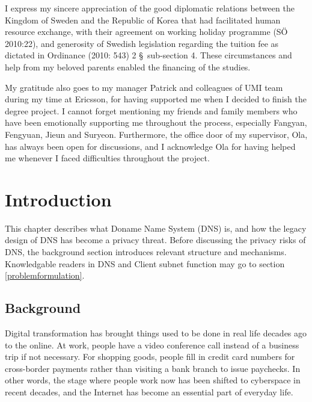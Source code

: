 \documentclass[a4paper,12pt]{article}
\begin{document}
\noindent I express my sincere appreciation of the good diplomatic relations between the Kingdom of Sweden and the Republic of Korea that had facilitated human resource exchange, with their agreement on working holiday programme (SÖ 2010:22), and generosity of Swedish legislation regarding the tuition fee as dictated in Ordinance (2010: 543) 2 \S \ sub-section 4.
These circumstances and help from my beloved parents enabled the financing of the studies.

My gratitude also goes to my manager Patrick and colleagues of UMI team during my time at Ericsson, for having supported me when I decided to finish the degree project.
I cannot forget mentioning my friends and family members who have been emotionally supporting me throughout the process, especially Fangyan, Fengyuan, Jieun and Suryeon. Furthermore, the office door of my supervisor, Ola, has always been open for discussions, and I acknowledge Ola for having helped me whenever I faced difficulties throughout the project.

\newpage
{}
\tableofcontents %
\newpage
{}

%
%

\section{Introduction}
This chapter describes what Doname Name System (DNS) is, and how the legacy design of DNS has become a privacy threat. Before discussing the privacy risks of DNS, the background section introduces relevant structure and mechanisms. Knowledgable readers in DNS and Client subnet function may go to section \ref{problemformulation}.

\subsection{Background}
Digital transformation has brought things used to be done in real life decades ago to the online. At work, people have a video conference call instead of a business trip if not necessary. For shopping goods, people fill in credit card numbers for cross-border payments rather than visiting a bank branch to issue paychecks. In other words, the stage where people work now has been shifted to cyberspace in recent decades, and the Internet has become an essential part of everyday life.
\end{document}

